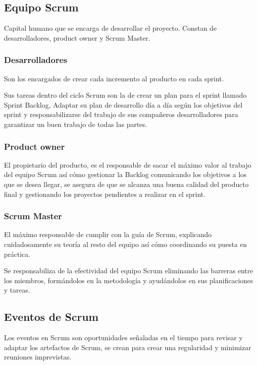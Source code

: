 \subsection{Equipo Scrum}

Capital humano que se encarga de desarrollar el proyecto. Constan de desarrolladores, product owner y Scrum Master.

\subsubsection{Desarrolladores}

Son los encargados de crear cada incremento al producto en cada sprint.

Sus tareas dentro del ciclo Scrum son la de crear un plan para el sprint llamado Sprint Backlog, Adaptar su plan de desarrollo día a día según los objetivos del sprint y responsabilizarse del trabajo de sus compañeros desarrolladores para garantizar un buen trabajo de todas las partes.

\subsubsection{Product owner}

El propietario del producto, es el responsable de sacar el máximo valor al trabajo del equipo Scrum así cómo gestionar la Backlog comunicando los objetivos a los que se desea llegar, se asegura de que se alcanza una buena calidad del producto final y gestionando los proyectos pendientes a realizar en el sprint.

\subsubsection{Scrum Master}

El máximo responsable de cumplir con la guía de Scrum, explicando cuidadosamente su teoría al resto del equipo así cómo coordinando su puesta en práctica.

Se responsabiliza de la efectividad del equipo Scrum eliminando las barreras entre los miembros, formándolos en la metodología y ayudándolos en sus planificaciones y tareas.


\subsection{Eventos de Scrum}

Los eventos en Scrum son oportunidades señaladas en el tiempo para revisar y adaptar los artefactos de Scrum, se crean para crear una regularidad y minimizar reuniones imprevistas.

